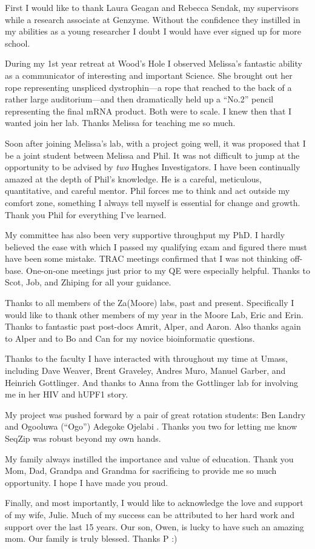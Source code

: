 \acknowledgements{}\label{hd:acknowledgements}

First I would like to thank Laura Geagan and Rebecca Sendak, my supervisors while a research associate at Genzyme. Without the confidence they instilled in my abilities as a young researcher I doubt I would have ever signed up for more school.

During my 1st year retreat at Wood’s Hole I observed Melissa's fantastic ability as a communicator of interesting and important Science. She brought out her rope representing unspliced dystrophin---a rope that reached to the back of a rather large auditorium---and then dramatically held up a ``No.2'' pencil representing the final mRNA product. Both were to scale. I knew then that I wanted join her lab. Thanks Melissa for teaching me so much.

Soon after joining Melissa’s lab, with a project going well, it was proposed that I be a joint student between Melissa and Phil. It was not difficult to jump at the opportunity to be advised by \textit{two} Hughes Investigators. I have been continually amazed at the depth of Phil’s knowledge. He is a careful, meticulous, quantitative, and careful mentor. Phil forces me to think and act outside my comfort zone, something I always tell myself is essential for change and growth. Thank you Phil for everything I've learned.

My committee has also been very supportive throughput my PhD. I hardly believed the ease with which I passed my qualifying exam and figured there must have been some mistake. TRAC meetings confirmed that I was not thinking off-base. One-on-one meetings just prior to my QE were especially helpful. Thanks to Scot, Job, and Zhiping for all your guidance.

Thanks to all members of the Za(Moore) labs, past and present. Specifically I would like to thank other members of my year in the Moore Lab, Eric and Erin. Thanks to fantastic past post-docs Amrit, Alper, and Aaron. Also thanks again to Alper and to Bo and Can for my novice bioinformatic questions.

Thanks to the faculty I have interacted with throughout my time at Umass, including Dave Weaver, Brent Graveley, Andres Muro, Manuel Garber, and Heinrich Gottlinger. And thanks to Anna from the Gottlinger lab for involving me in her HIV and hUPF1 story.

My project was pushed forward by a pair of great rotation students: Ben Landry and Ogooluwa (``Ogo'') Adegoke Ojelabi . Thanks you two for letting me know SeqZip was robust beyond my own hands.

My family always instilled the importance and value of education. Thank you Mom, Dad, Grandpa and Grandma for sacrificing to provide me so much opportunity. I hope I have made you proud.

Finally, and most importantly, I would like to acknowledge the love and support of my wife, Julie. Much of my success can be attributed to her hard work and support over the last 15 years. Our son, Owen, is lucky to have such an amazing mom. Our family is truly blessed. Thanks P :)

\clearpage %